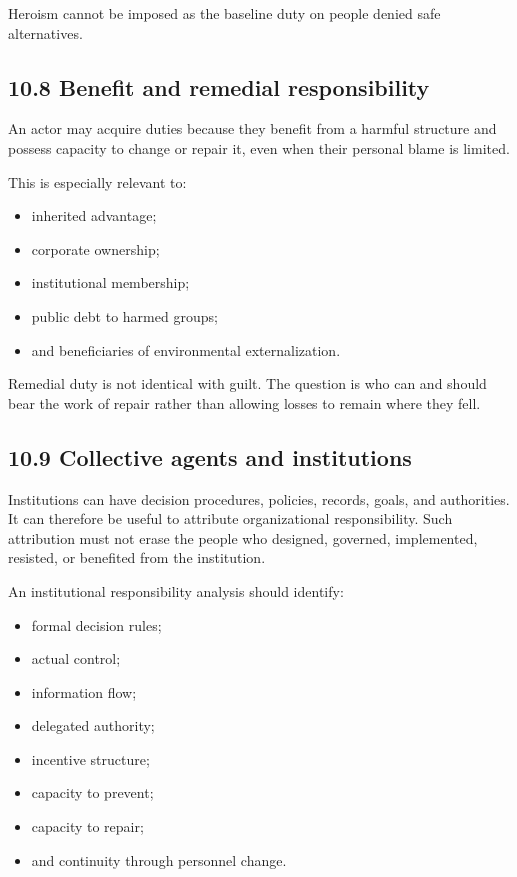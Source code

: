 \documentclass[
  11pt,
]{article}
\providecommand{\tightlist}{%
  \setlength{\itemsep}{0pt}\setlength{\parskip}{0pt}}
\begin{document}
Heroism cannot be imposed as the baseline duty on people denied safe
alternatives.

\subsection{10.8 Benefit and remedial
responsibility}\label{benefit-and-remedial-responsibility}

An actor may acquire duties because they benefit from a harmful
structure and possess capacity to change or repair it, even when their
personal blame is limited.

This is especially relevant to:

\begin{itemize}
\tightlist
\item
  inherited advantage;
\item
  corporate ownership;
\item
  institutional membership;
\item
  public debt to harmed groups;
\item
  and beneficiaries of environmental externalization.
\end{itemize}

Remedial duty is not identical with guilt. The question is who can and
should bear the work of repair rather than allowing losses to remain
where they fell.

\subsection{10.9 Collective agents and
institutions}\label{collective-agents-and-institutions}

Institutions can have decision procedures, policies, records, goals, and
authorities. It can therefore be useful to attribute organizational
responsibility. Such attribution must not erase the people who designed,
governed, implemented, resisted, or benefited from the institution.

An institutional responsibility analysis should identify:

\begin{itemize}
\tightlist
\item
  formal decision rules;
\item
  actual control;
\item
  information flow;
\item
  delegated authority;
\item
  incentive structure;
\item
  capacity to prevent;
\item
  capacity to repair;
\item
  and continuity through personnel change.
\end{itemize}
\end{document}
